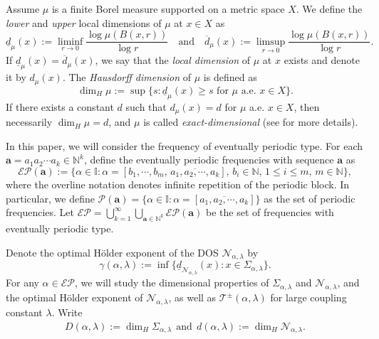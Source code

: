 \documentclass[reqno,11pt,graphicx,]{amsart}
\numberwithin{equation}{section}
\theoremstyle{plain}
\newcommand{\N}{{\mathbb N}}
\newcommand{\3}{\mathbf{3}}
\newcommand{\ma}{\mathbf{a}}
\begin{document}
	Assume  $\mu$ is a finite Borel measure supported  on a  metric space $X$. We define the {\it  lower} and {\it upper } local dimensions of $\mu$ at $x\in X$ as
	\begin{equation}\label{def-loc-dim}
		\underline{d}_\mu(x):=\liminf_{r\to0}\frac{\log \mu(B(x,r))}{\log r}\ \ \ \text{ and }\ \ \ \overline{d}_\mu(x):=\limsup_{r\to0}\frac{\log \mu(B(x,r))}{\log r}.
	\end{equation}
	If  $\underline{d}_\mu(x)=\overline{d}_\mu(x)$, we say that the {\it local  dimension} of   $\mu$ at $x$ exists and denote it by $d_\mu(x)$. 
	The {\it Hausdorff dimension} of $\mu$ is defined as
	\begin{equation}\label{dim-meas}
		\dim_H\mu:=\sup\{s: \underline{d}_\mu(x)\ge s \text{ for  } \mu \text{ a.e. }x\in X\}.
	\end{equation}
	If there exists a constant $d$ such that $d_\mu(x)=d$ for $\mu$ a.e. $x\in X$, then necessarily $\dim_H\mu=d$, and $\mu$ is called {\it exact-dimensional} (see \cite[Chapter 10]{Fa1997} for more details).
	
	In this paper, we will consider the frequency of eventually periodic type. %
	For each $\mathbf{a}=a_1a_2\cdots a_k\in\N^k$, define the eventually periodic frequencies with sequence $\ma$ as
	\begin{equation*}
		\mathcal{EP}(\mathbf{a}):=\Big\{\alpha\in{\mathbb{I}}:\alpha=[b_1,\cdots,
		b_m,\, \overline{a_1,a_2,\cdots,a_k}],\, b_i\in{\mathbb{N}},\, 1\leq i\leq m,\,m\in\N
		\Big\},
	\end{equation*} 
	where the overline notation denotes infinite repetition of the periodic block. In particular, we define $\mathcal{P}(\ma)=\{\alpha\in{\mathbb{I}}:\alpha=[\overline{a_1,a_2,\cdots,a_k}]
	\}$ as the set of periodic frequencies. Let $\mathcal{EP}=\bigcup_{k=1}^{\infty}\bigcup_{\ma\in\N^k}\mathcal{EP}(\ma)$
	be the set of frequencies with eventually periodic type. 
	
	Denote the optimal H\"older exponent of the DOS $\mathcal{N}_{\alpha,\lambda}$ by 
	\begin{equation}\label{def-gamma}
		\gamma(\alpha,\lambda):=\inf\{\underline{d}_{\mathcal{N}_{\alpha,\lambda}}(x):x\in \Sigma_{\alpha,\lambda}\}.
	\end{equation}
	For any $\alpha\in\mathcal{EP}$, we will study the dimensional properties of $\Sigma_{\alpha,\lambda}$ and $\mathcal{N}_{\alpha,\lambda}$, and the optimal H\"older exponent of $\mathcal{N}_{\alpha,\lambda}$,
	as well as $\mathcal{T}^{\pm}(\alpha,\lambda)$ for large
	coupling constant $\lambda$. Write
	\begin{align*}
		D(\alpha,\lambda):=\dim_{H}\Sigma_{\alpha,\lambda}\ \ \text{and}\ \  d(\alpha,\lambda):=\dim_H\mathcal{N}_{\alpha,\lambda}.
	\end{align*}
\end{document}

